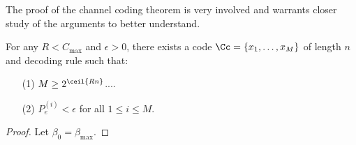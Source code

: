 \begin{remark}
    The proof of the channel coding theorem is very involved and warrants closer
    study of the arguments to better understand.
\end{remark}
\begin{corollary}
    For any $R<C_{\max}$ and $\epsilon>0$, there exists a code  $\Cc=\{x_1,
    \dots, x_M\}$ of length $n$ and decoding rule such that:
    \begin{enumerate}
        \item[(1)] $M \geq 2^{\ceil{Rn}}$....

        \item[(2)] $P_e^{(i)}<\epsilon$ for all $1 \leq i \leq M$.
    \end{enumerate}
\end{corollary}
\begin{proof}
    Let $\beta_0=\beta_{\max}$.
\end{proof}
